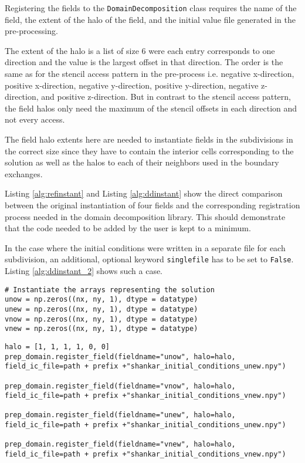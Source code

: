 Registering the fields to the \texttt{DomainDecomposition} class requires the name of the field, the extent of the halo of the field, and the initial value file generated in the pre-processing.

The extent of the halo is a list of size 6 were each entry corresponds to one direction and the value is the largest offset in that direction.
The order is the same as for the stencil access pattern in the pre-process i.e. negative x-direction, positive x-direction, negative y-direction, positive y-direction, negative z-direction, and positive z-direction.
But in contrast to the stencil access pattern, the field halos only need the maximum of the stencil offsets in each direction and not every access.

The field halo extents here are needed to instantiate fields in the subdivisions in the correct size since they have to contain the interior cells corresponding to the solution as well as the halos to each of their neighbors used in the boundary exchanges.

Listing \ref{alg:refinstant} and Listing \ref{alg:ddinstant} show the direct comparison between the original instantiation of four fields and the corresponding registration process needed in the domain decomposition library.
This should demonstrate that the code needed to be added by the user is kept to a minimum.

In the case where the initial conditions were written in a separate file for each subdivision, an additional, optional keyword \texttt{singlefile} has to be set to \texttt{False}.
Listing \ref{alg:ddinstant_2} shows such a case.

\begin{lstlisting}[caption={Example code for the original user field instantiation.},captionpos=b, label={alg:refinstant}, float, floatplacement=H]
# Instantiate the arrays representing the solution
unow = np.zeros((nx, ny, 1), dtype = datatype)
unew = np.zeros((nx, ny, 1), dtype = datatype)
vnow = np.zeros((nx, ny, 1), dtype = datatype)
vnew = np.zeros((nx, ny, 1), dtype = datatype)
\end{lstlisting} 

\begin{lstlisting}[caption={Example code for the same field instantiation using the domain decomposition library.},captionpos=b, label={alg:ddinstant_2}, float, floatplacement=H]
halo = [1, 1, 1, 1, 0, 0]
prep_domain.register_field(fieldname="unow", halo=halo, field_ic_file=path + prefix +"shankar_initial_conditions_unew.npy")

prep_domain.register_field(fieldname="vnow", halo=halo, field_ic_file=path + prefix +"shankar_initial_conditions_vnew.npy")

prep_domain.register_field(fieldname="unew", halo=halo, field_ic_file=path + prefix +"shankar_initial_conditions_unew.npy")

prep_domain.register_field(fieldname="vnew", halo=halo, field_ic_file=path + prefix +"shankar_initial_conditions_vnew.npy")
\end{lstlisting}


